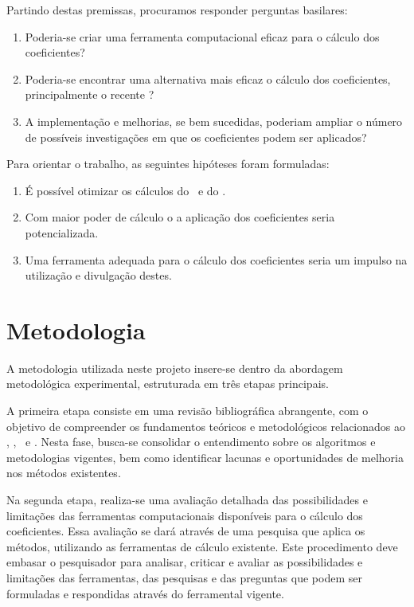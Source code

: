 Partindo destas premissas, procuramos responder perguntas basilares:

\begin{enumerate}
    \label{enum:quest}
    \item Poderia-se criar uma ferramenta computacional eficaz para o cálculo dos coeficientes?
    \item Poderia-se encontrar uma alternativa mais eficaz o cálculo dos coeficientes, principalmente o recente \dmc?
    \item A implementação e melhorias, se bem sucedidas, poderiam ampliar o número de possíveis investigações em que os coeficientes podem ser aplicados?
\end{enumerate}

Para orientar o trabalho, as seguintes hipóteses foram formuladas:

\begin{enumerate}
    \item É possível otimizar os cálculos do \pdcca~e do \dmc.
    \item Com maior poder de cálculo o a aplicação dos coeficientes seria potencializada.
	\item Uma ferramenta adequada para o cálculo dos coeficientes seria um impulso na utilização e divulgação destes.
\end{enumerate}

\section{Metodologia}
\label{sec:metodologia}

A metodologia utilizada neste projeto insere-se dentro da abordagem metodológica experimental, estruturada em três etapas principais.

A primeira etapa consiste em uma revisão bibliográfica abrangente, com o objetivo de compreender os fundamentos teóricos e metodológicos relacionados ao \dfa, \dcca, \pdcca~e \dmc. Nesta fase, busca-se consolidar o entendimento sobre os algoritmos e metodologias vigentes, bem como identificar lacunas e oportunidades de melhoria nos métodos existentes.

Na segunda etapa, realiza-se uma avaliação detalhada das possibilidades e limitações das ferramentas computacionais disponíveis para o cálculo dos coeficientes. Essa avaliação se dará através de uma pesquisa que aplica os métodos, utilizando as ferramentas de cálculo existente. Este procedimento deve embasar o pesquisador para analisar, criticar e avaliar as possibilidades e limitações das ferramentas, das pesquisas e das preguntas que podem ser formuladas e respondidas através do ferramental vigente.

